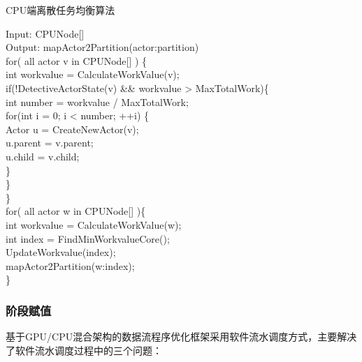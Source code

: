 \begin{algorithm}
  \caption{CPU端离散任务均衡算法}
  \label{algo:cpureflect}
  Input: CPUNode[]\\
  Output: mapActor2Partition(actor:partition)\\
  for( all actor v in CPUNode[] ) \{\\
    \hspace*{1 pc} int workvalue = CalculateWorkValue(v);\\
    \hspace*{1 pc} if(!DetectiveActorState(v) \&\& workvalue > MaxTotalWork)\{\\
    \hspace*{2 pc} int number = workvalue / MaxTotalWork;\\
    \hspace*{2 pc} for(int i = 0; i < number; ++i) \{\\
    \hspace*{3 pc} Actor u = CreateNewActor(v);\\
    \hspace*{3 pc} u.parent = v.parent;\\
    \hspace*{3 pc} u.child = v.child;\\
    \hspace*{2 pc} \}\\
    \hspace*{1 pc} \}\\
  \}\\
  for( all actor w in CPUNode[] )\{\\
    \hspace*{1 pc} int workvalue = CalculateWorkValue(w);\\
    \hspace*{1 pc} int index = FindMinWorkvalueCore();\\
    \hspace*{1 pc} UpdateWorkvalue(index);\\
    \hspace*{1 pc} mapActor2Partition(w:index);\\
  \}
  \end{algorithm}

\subsubsection{阶段赋值}
基于GPU/CPU混合架构的数据流程序优化框架采用软件流水调度方式，主要解决了软件流水调度过程中的三个问题：

